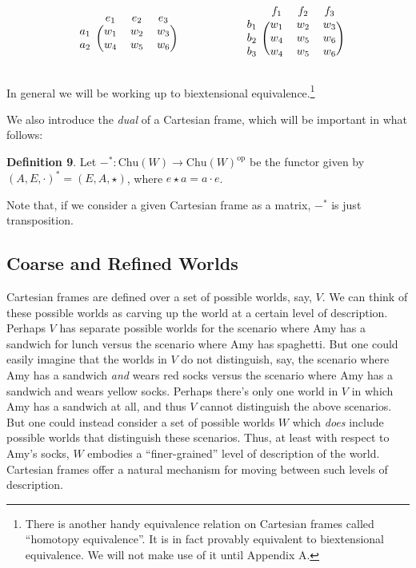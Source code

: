 \documentclass{article}
\begin{document}
\bigskip
\[
\begin{blockarray}{cccc}
& e_1 & e_2 & e_3\\
\begin{block}{c(ccc)}
a_1 & w_1 & w_2 & w_3\\
a_2 & w_4 & w_5 & w_6\\
\end{block}
\end{blockarray}
\hspace{2cm}
\begin{blockarray}{cccc}
& f_1 & f_2 & f_3\\
\begin{block}{c(ccc)}
b_1 & w_1 & w_2 & w_3\\
b_2 & w_4 & w_5 & w_6\\
b_3 & w_4 & w_5 & w_6\\
\end{block}
\end{blockarray}
\]


\noindent In general we will be working up to biextensional equivalence.\footnote{There is another handy equivalence relation on Cartesian frames called ``homotopy equivalence''. It is in fact provably equivalent to biextensional equivalence. We will not make use of it until Appendix A.}


We also introduce the \emph{dual} of a Cartesian frame, which will be important in what follows:

\bigskip
\noindent \textbf{Definition 9}.
Let $-^* : \text{Chu}(W) \to \text{Chu}(W)^{\text{op}}$ be the functor given by $(A, E, \cdot)^* = (E, A, \star)$, where $e \star a = a \cdot e$.\footnotemark
{}

\bigskip
\noindent Note that, if we consider a given Cartesian frame as a matrix, $-^*$ is just transposition.

\subsection{Coarse and Refined Worlds}
\label{coarse}

Cartesian frames are defined over a set of possible worlds, say, $V$.
We can think of these possible worlds as carving up the world at a certain level of description.
Perhaps $V$ has separate possible worlds for the scenario where Amy has a sandwich for lunch versus the scenario where Amy has spaghetti.
But one could easily imagine that the worlds in $V$ do not distinguish, say, the scenario where Amy has a sandwich \emph{and} wears red socks versus the scenario where Amy has a sandwich and wears yellow socks.
Perhaps there's only one world in $V$ in which Amy has a sandwich at all, and thus $V$ cannot distinguish the above scenarios.
But one could instead consider a set of possible worlds $W$ which \emph{does} include possible worlds that distinguish these scenarios.
Thus, at least with respect to Amy's socks, $W$ embodies a ``finer-grained'' level of description of the world.
Cartesian frames offer a natural mechanism for moving between such levels of description.
\end{document}
